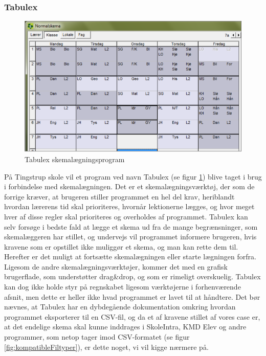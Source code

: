 \subsubsection{Tabulex}
\begin{figure}[h!]
	\centering
	\includegraphics[width=1.0\textwidth]{../Billeder/TabulexPicture.png}
	\caption{Tabulex skemalægningsprogram\cite{Tabulex}}
	\label{fig:TabulexPicture}
\end{figure}
\FloatBarrier
På Tingstrup skole vil et program ved navn Tabulex (se figur \ref{fig:TabulexPicture}) blive taget i brug i forbindelse med skemalægningen. Det er et skemalægningsværktøj, der som de forrige kræver, at brugeren stiller programmet en hel del krav, heriblandt hvordan lærerens tid skal prioriteres, hvornår lektionerne lægges, og hvor meget hver af disse regler skal prioriteres og overholdes af programmet\cite{Tabulex}. Tabulex kan selv forsøge i bedste fald at lægge et skema ud fra de mange begrænsninger, som skemalæggeren har stillet, og undervejs vil programmet informere brugeren, hvis kravene som er opstillet ikke muliggør et skema, og man kan rette dem til. Herefter er det  muligt at fortsætte skemalægningen eller starte lægningen forfra. Ligesom de andre skemalægningsværktøjer, kommer det med en grafisk brugerflade, som understøtter drag\&drop, og som er rimeligt overskuelig. Tabulex kan dog ikke holde styr på regnskabet ligesom værktøjerne i forhenværende afsnit, men dette er heller ikke hvad programmet er lavet til at håndtere. Det bør nævnes, at Tabulex har en dybdegående dokumentation omkring hvordan programmet eksporterer til en CSV-fil\cite{Tabulex_csv}, og da et af kravene stillet af vores case er, at det endelige skema skal kunne inddrages i SkoleIntra, KMD Elev og andre programmer\cite{interview_Kaerby}, som netop tager imod CSV-formatet (se figur \ref{fig:kompatibleFiltyper}), er dette noget, vi vil kigge nærmere på.
